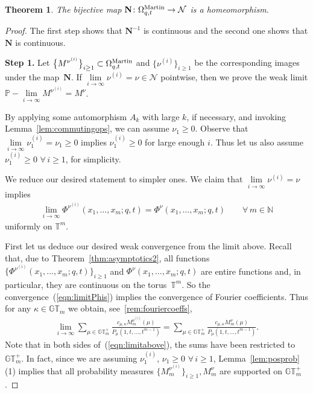 \documentclass[pdftex]{sigma}
\numberwithin{equation}{section}
\newtheorem{thm}{Theorem}[section]
\newcommand{\N}{\mathbb{N}}
\newcommand{\Nu}{\mathcal{N}}
\newcommand{\GT}{\mathbb{GT}}
\newcommand{\GTp}{\mathbb{GT}^+}
\newcommand{\TT}{\mathbb{T}}
\newcommand{\Mart}{\Omega_{q, t}^{\rm Martin}}
\newcommand{\NN}{\mathbf{N}}
\begin{document}
\begin{thm}\label{thm:characterization}
The bijective map $\NN \colon \Mart \rightarrow \Nu$ is a homeomorphism.
\end{thm}

\begin{proof}
The f\/irst step shows that $\NN^{-1}$ is continuous and the second one shows that $\NN$ is continuous.

\textbf{Step 1.} Let $\big\{M^{\nu^{(i)}}\big\}_{i\geq 1} \subset \Omega_{q, t}^{{\rm Martin}}$ and $\big\{\nu^{(i)}\big\}_{i\geq 1}$ be the corresponding images under the map~$\NN$. If $\lim\limits_{i\rightarrow\infty}{\nu^{(i)}} = \nu\in\Nu$ pointwise, then we prove the weak limit $\mathbb{P}-\lim\limits_{i\rightarrow\infty}{M^{\nu^{(i)}}} = M^{\nu}$.

By applying some automorphism $A_k$ with large $k$, if necessary, and invoking Lemma~\ref{lem:commutingops}, we can assume $\nu_1 \geq 0$. Observe that $\lim\limits_{i\rightarrow\infty}{\nu^{(i)}_1} = \nu_1 \geq 0$ implies $\nu^{(i)}_1 \geq 0$ for large enough $i$. Thus let us also assume $\nu^{(i)}_1 \geq 0$ $\forall\, i\geq 1$, for simplicity.

We reduce our desired statement to simpler ones. We claim that $\lim\limits_{i\rightarrow\infty}{\nu^{(i)}} = \nu$ implies
\begin{gather}\label{eqn:limitPhis}
\lim_{i\rightarrow\infty}{\Phi^{\nu^{(i)}}(x_1, \dots, x_m; q, t)} = \Phi^{\nu}(x_1, \dots, x_m; q, t) \qquad \forall\, m\in\N
\end{gather}
uniformly on $\TT^m$.

First let us deduce our desired weak convergence from the limit above.
Recall that, due to Theorem~\ref{thm:asymptotics2}, all functions $\big\{\Phi^{\nu^{(i)}}(x_1, \dots, x_m; q, t)\big\}_{i \geq 1}$ and $\Phi^{\nu}(x_1, \dots, x_m; q, t)$ are entire functions and, in particular, they are continuous on the torus~$\TT^m$. So the convergence~(\ref{eqn:limitPhis}) implies the convergence of Fourier coef\/f\/icients. Thus for any $\kappa\in\GT_m$ we obtain, see~\eqref{rem:fouriercoeffs},
\begin{gather}\label{eqn:limitabove}
\lim_{i\rightarrow\infty}{ \sum_{\mu\in\GTp_m}{\frac{c_{\mu, \kappa}M^{\nu^{(i)}}_m(\mu)}{P_{\mu}(1, t, \dots, t^{m-1})}} } = \sum_{\mu\in\GTp_m}{\frac{c_{\mu, \kappa}M^{\nu}_m(\mu)}{P_{\mu}(1, t, \dots, t^{m-1})}}.
\end{gather}
Note that in both sides of~(\ref{eqn:limitabove}), the sums have been restricted to~$\GTp_m$. In fact, since we are assuming $\nu^{(i)}_1$, $\nu_1 \geq 0$ $\forall\, i\geq 1$, Lemma~\ref{lem:posprob}(1) implies that all probability measures $\big\{M^{\nu^{(i)}}_m\big\}_{i\geq 1}, M^{\nu}_m$ are supported on $\GTp_m$.


\end{proof}
\end{document}
